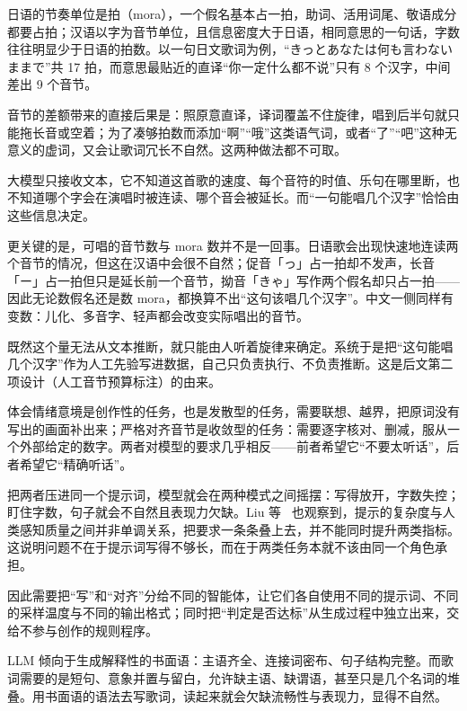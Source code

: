 \documentclass[12pt, a4paper]{ctexart}
\numberwithin{table}{section}
\numberwithin{figure}{section}
\begin{document}

日语的节奏单位是拍（mora），一个假名基本占一拍，助词、活用词尾、敬语成分都要占拍；汉语以字为音节单位，且信息密度大于日语，相同意思的一句话，字数往往明显少于日语的拍数。以一句日文歌词为例，“きっとあなたは何も言わないままで”共 17 拍，而意思最贴近的直译“你一定什么都不说”只有 8 个汉字，中间差出 9 个音节。

音节的差额带来的直接后果是：照原意直译，译词覆盖不住旋律，唱到后半句就只能拖长音或空着；为了凑够拍数而添加“啊”“哦”这类语气词，或者“了”“吧”这种无意义的虚词，又会让歌词冗长不自然。这两种做法都不可取。


大模型只接收文本，它不知道这首歌的速度、每个音符的时值、乐句在哪里断，也不知道哪个字会在演唱时被连读、哪个音会被延长。而“一句能唱几个汉字”恰恰由这些信息决定。

更关键的是，可唱的音节数与 mora 数并不是一回事。日语歌会出现快速地连读两个音节的情况，但这在汉语中会很不自然；促音「っ」占一拍却不发声，长音「ー」占一拍但只是延长前一个音节，拗音「きゃ」写作两个假名却只占一拍——因此无论数假名还是数 mora，都换算不出“这句该唱几个汉字”。中文一侧同样有变数：儿化、多音字、轻声都会改变实际唱出的音节。

既然这个量无法从文本推断，就只能由人听着旋律来确定。系统于是把“这句能唱几个汉字”作为人工先验写进数据，自己只负责执行、不负责推断。这是后文第二项设计（人工音节预算标注）的由来。


体会情绪意境是创作性的任务，也是发散型的任务，需要联想、越界，把原词没有写出的画面补出来；严格对齐音节是收敛型的任务：需要逐字核对、删减，服从一个外部给定的数字。两者对模型的要求几乎相反——前者希望它“不要太听话”，后者希望它“精确听话”。

把两者压进同一个提示词，模型就会在两种模式之间摇摆：写得放开，字数失控；盯住字数，句子就会不自然且表现力欠缺。Liu 等~\cite{hanze-etal-2026-towards} 也观察到，提示的复杂度与人类感知质量之间并非单调关系，把要求一条条叠上去，并不能同时提升两类指标。这说明问题不在于提示词写得不够长，而在于两类任务本就不该由同一个角色承担。

因此需要把“写”和“对齐”分给不同的智能体，让它们各自使用不同的提示词、不同的采样温度与不同的输出格式；同时把“判定是否达标”从生成过程中独立出来，交给不参与创作的规则程序。


LLM 倾向于生成解释性的书面语：主语齐全、连接词密布、句子结构完整。而歌词需要的是短句、意象并置与留白，允许缺主语、缺谓语，甚至只是几个名词的堆叠。用书面语的语法去写歌词，读起来就会欠缺流畅性与表现力，显得不自然。
\end{document}
